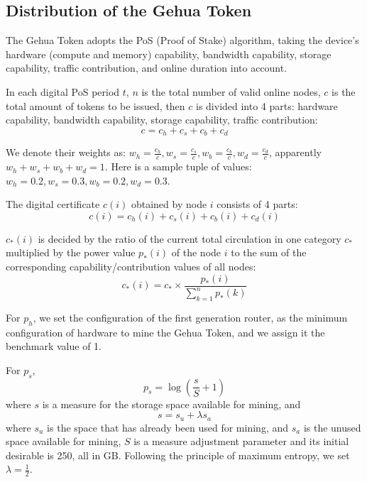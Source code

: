 \subsection{Distribution of the Gehua Token}
The Gehua Token adopts the PoS (Proof of Stake) algorithm, taking the device's hardware (compute and memory) capability, bandwidth capability, storage capability, traffic contribution, and online duration into account. 

In each digital PoS period $t$, $n$ is the total number of valid online nodes, $c$ is the total amount of tokens to be issued, then $c$ is divided into 4 parts: hardware capability, bandwidth capability, storage capability, traffic contribution: 
\begin{equation}
	c = c_h + c_s + c_b + c_d
\end{equation}

We denote their weights as: $w_h = \frac{c_h}{c}, w_s = \frac{c_s}{c}, w_b = \frac{c_b}{c}, w_d = \frac{c_d}{c}$, apparently $w_h + w_s + w_b + w_d = 1$. Here is a sample tuple of values: $w_h = 0.2, w_s = 0.3, w_b = 0.2,  w_d = 0.3$. 

The digital certificate $c(i)$ obtained by node $i$ consists of 4 parts:
\begin{equation}
	c(i) = c_h(i) + c_s(i) + c_b(i) + c_d(i)
\end{equation} 

$c_{*}(i)$ is decided by the ratio of the current total circulation in one category $c_{*}$ multiplied by the power value $p_{*}(i)$ of the node $i$ to the sum of the corresponding capability/contribution values of all nodes: 
\begin{equation}
	c_{*}(i) = c_{*}\times \frac{p_{*}(i)}{\sum\limits_{k=1}^n{p_{*}(k)}}
\end{equation}

For $p_h$, we set the configuration of the first generation router, as the minimum configuration of hardware to mine the Gehua Token, and we assign it the benchmark value of 1. 

For $p_s$, 
\begin{equation}
	p_s = \log{(\frac{s}{S}+1)}
\end{equation}
where $s$ is a measure for the storage space available for mining, and 
\begin{equation}
	s = s_u + \lambda s_a
\end{equation}
where $s_u$ is the space that has already been used for mining, and $s_a$ is the unused space available for mining, $S$ is a measure adjustment parameter and its initial desirable is 250, all in GB. Following the principle of maximum entropy, we set $\lambda = \frac{1}{2}$. 

